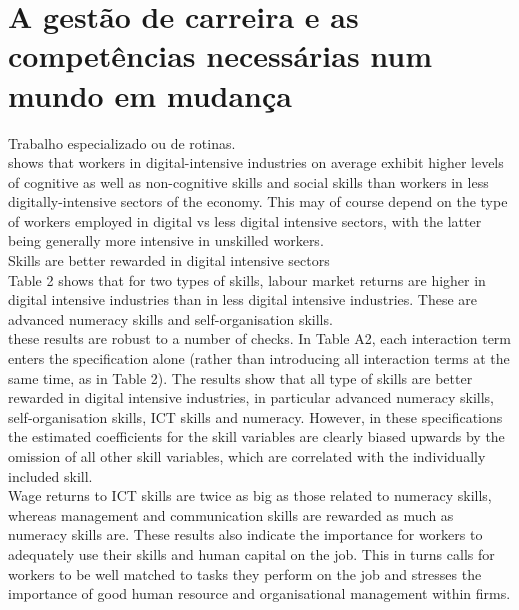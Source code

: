 \newpage
\section{A gestão de carreira e as competências necessárias num mundo em mudança}


Trabalho especializado ou de rotinas.\\

shows that workers in digital-intensive industries on average exhibit higher levels of cognitive as well as non-cognitive skills and social skills than workers in less digitally-intensive sectors of the economy. This may of course depend on the type of workers employed in digital vs less digital intensive sectors, with the latter being generally more intensive in unskilled workers.\\

Skills are better rewarded in digital intensive sectors\\

Table 2 shows that for two types of skills, labour market returns are higher in digital intensive industries than in less digital intensive industries. These are advanced numeracy skills and self-organisation skills.\\

these results are robust to a number of checks. In Table A2, each interaction term enters the specification alone (rather than introducing all interaction terms at the same time, as in Table 2). The results show that all type of skills are better rewarded in digital intensive industries, in particular advanced numeracy skills, self-organisation skills, ICT skills and numeracy. However, in these specifications the estimated coefficients for the skill variables are clearly biased upwards by the omission of all other skill variables, which are correlated with the individually included skill.\\



Wage returns to ICT skills are twice as big as those related to numeracy skills, whereas management and communication skills are rewarded as much as numeracy skills are. These results also indicate the importance for workers to adequately use their skills and human capital on the job. This in turns calls for workers to be well matched to tasks they perform on the job and stresses the importance of good human resource and organisational management within firms.

